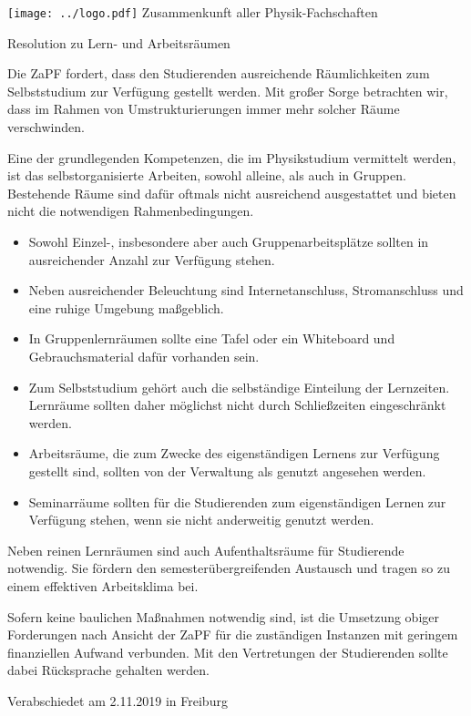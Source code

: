 \documentclass[a4paper]{scrartcl}
\begin{document}
    \hspace{0.87\textwidth}
    \begin{minipage}{120pt}
        \vspace{-1.8cm}
        \texttt{[image: ../logo.pdf]}
        \centering
        \small Zusammenkunft aller Physik-Fachschaften
    \end{minipage}
    \begin{center}
        \huge{Resolution zu Lern- und Arbeitsräumen}\vspace{.25\baselineskip}\\
        \normalsize
    \end{center}
    \vspace{0.5cm}

Die ZaPF fordert, dass den Studierenden ausreichende Räumlichkeiten zum Selbststudium zur Verfügung gestellt werden. Mit großer Sorge betrachten wir, dass im Rahmen von Umstrukturierungen immer mehr solcher Räume verschwinden.


Eine der grundlegenden Kompetenzen, die im Physikstudium vermittelt werden, ist das selbstorganisierte Arbeiten, sowohl alleine, als auch in Gruppen. Bestehende Räume sind dafür oftmals nicht ausreichend ausgestattet und bieten nicht die notwendigen Rahmenbedingungen.

\begin{itemize}
	\item Sowohl Einzel-, insbesondere aber auch Gruppenarbeitsplätze sollten in ausreichender Anzahl zur Verfügung stehen.
	\item Neben ausreichender Beleuchtung sind Internetanschluss, Stromanschluss und eine ruhige Umgebung maßgeblich.
	\item In Gruppenlernräumen sollte eine Tafel oder ein Whiteboard und Gebrauchsmaterial dafür vorhanden sein.
	\item Zum Selbststudium gehört auch die selbständige Einteilung der Lernzeiten. Lern\-räume sollten daher möglichst nicht durch Schließzeiten eingeschränkt werden.
	\item Arbeitsräume, die zum Zwecke des eigenständigen Lernens zur Verfügung gestellt sind, sollten von der Verwaltung als genutzt angesehen werden.
	\item Seminarräume sollten für die Studierenden zum eigenständigen Lernen zur Ver\-fügung stehen, wenn sie nicht anderweitig genutzt werden.
\end{itemize}

Neben reinen Lernräumen sind auch Aufenthaltsräume für Studierende notwendig. Sie fördern den semesterübergreifenden Austausch und tragen so zu einem effektiven Arbeitsklima bei.

Sofern keine baulichen Maßnahmen notwendig sind, ist die Umsetzung obiger Forderungen nach Ansicht der ZaPF für die zuständigen Instanzen mit geringem finanziellen Aufwand verbunden. Mit den Vertretungen der Studierenden sollte dabei Rücksprache gehalten werden.

\vspace*{\fill}
\begin{flushright}
	Verabschiedet am 2.11.2019 in Freiburg
\end{flushright}
\end{document}

